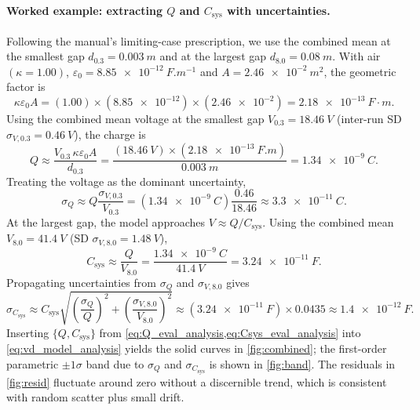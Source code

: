 \documentclass[12pt]{article}
\begin{document}
\paragraph{Worked example: extracting \(Q\) and \(C_{\mathrm{sys}}\) with uncertainties.}
Following the manual’s limiting-case prescription, we use the combined mean at the smallest gap \(d_{0.3}=\SI{0.003}{m}\) and at the largest gap \(d_{8.0}=\SI{0.08}{m}\). With air \((\kappa=1.00)\), \(\varepsilon_0=\num{8.85e-12}\ \si{F.m^{-1}}\) and \(A=\num{2.46e-2}\ \si{m^2}\), the geometric factor is
\begin{equation}
    \kappa\varepsilon_0A = (1.00)\times(\num{8.85e-12})\times(\num{2.46e-2})
    = \num{2.18e-13}\ \si{F\cdot m}.
    \label{eq:geom_factor}
\end{equation}
Using the combined mean voltage at the smallest gap \(V_{0.3}=\SI{18.46}{V}\) (inter-run SD \(\sigma_{V,0.3}=\SI{0.46}{V}\)), the charge is
\begin{equation}
    Q \approx \frac{V_{0.3}\,\kappa\varepsilon_0A}{d_{0.3}}
      = \frac{(\SI{18.46}{V})\times(\SI{2.18e-13}{F.m})}{\SI{0.003}{m}}
      = \SI{1.34e-9}{C}.
    \label{eq:Q_eval_analysis}
\end{equation}
Treating the voltage as the dominant uncertainty,
\begin{equation}
    \sigma_Q \approx Q \frac{\sigma_{V,0.3}}{V_{0.3}}
    = (\SI{1.34e-9}{C})\frac{0.46}{18.46}
    \approx \SI{3.3e-11}{C}.
    \label{eq:dQ}
\end{equation}
At the largest gap, the model approaches \(V\approx Q/C_{\mathrm{sys}}\). Using the combined mean \(V_{8.0}=\SI{41.4}{V}\) (SD \(\sigma_{V,8.0}=\SI{1.48}{V}\)),
\begin{equation}
    C_{\mathrm{sys}} \approx \frac{Q}{V_{8.0}}
    = \frac{\SI{1.34e-9}{C}}{\SI{41.4}{V}}
    = \SI{3.24e-11}{F}.
    \label{eq:Csys_eval_analysis}
\end{equation}
Propagating uncertainties from \(\sigma_Q\) and \(\sigma_{V,8.0}\) gives
\begin{equation}
    \sigma_{C_{\mathrm{sys}}} \approx C_{\mathrm{sys}}
    \sqrt{\left(\frac{\sigma_Q}{Q}\right)^2+\left(\frac{\sigma_{V,8.0}}{V_{8.0}}\right)^2}
    \approx (\SI{3.24e-11}{F})\times 0.0435
    \approx \SI{1.4e-12}{F}.
    \label{eq:dCsys}
\end{equation}
Inserting \(\{Q, C_{\mathrm{sys}}\}\) from \cref{eq:Q_eval_analysis,eq:Csys_eval_analysis} into \cref{eq:vd_model_analysis} yields the solid curves in \cref{fig:combined}; the first-order parametric \(\pm1\sigma\) band due to \(\sigma_Q\) and \(\sigma_{C_{\mathrm{sys}}}\) is shown in \cref{fig:band}. The residuals in \cref{fig:resid} fluctuate around zero without a discernible trend, which is consistent with random scatter plus small drift.
\end{document}
